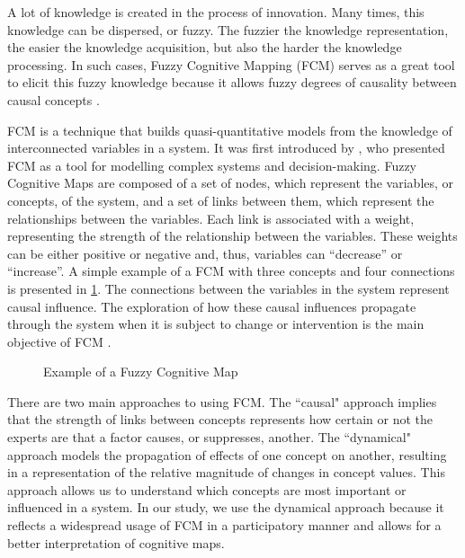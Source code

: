 A lot of knowledge is created in the process of innovation. Many times, this knowledge can be dispersed, or fuzzy. The fuzzier the knowledge representation, the easier the knowledge acquisition, but also the harder the knowledge processing. In such cases, Fuzzy Cognitive Mapping (FCM) serves as a great tool to elicit this fuzzy knowledge because it allows fuzzy degrees of causality between causal concepts \citep{kosko1986fuzzy}. 

FCM is a technique that builds quasi-quantitative models from the knowledge of interconnected variables in a system. It was first introduced by \cite{kosko1986fuzzy}, who presented FCM as a tool for modelling complex systems and decision-making. Fuzzy Cognitive Maps are composed of a set of nodes, which represent the variables, or concepts, of the system, and a set of links between them, which represent the relationships between the variables. Each link is associated with a weight, representing the strength of the relationship between the variables. These weights can be either positive or negative and, thus, variables can ``decrease'' or ``increase''. A simple example of a FCM with three concepts and four connections is presented in \cref{example_fcm}. The connections between the variables in the system represent causal influence. The exploration of how these causal influences propagate through the system when it is subject to change or intervention is the main objective of FCM \cite{barbrook2022systems}.

\begin{figure}[H]
\caption{Example of a Fuzzy Cognitive Map}  
\label{example_fcm}
\centering

\end{figure}

There are two main approaches to using FCM. The ``causal" approach implies that the strength of links between concepts represents how certain or not the experts are that a factor causes, or suppresses, another. The ``dynamical" approach models the propagation of effects of one concept on another, resulting in a representation of the relative magnitude of changes in concept values. This approach allows us to understand which concepts are most important or influenced in a system. In our study, we use the dynamical approach because it reflects a widespread usage of FCM in a participatory manner and allows for a better interpretation of cognitive maps.

